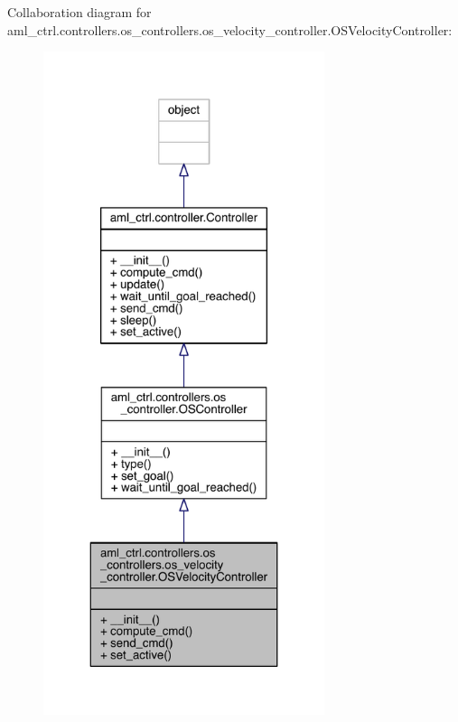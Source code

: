Collaboration diagram for aml\+\_\+ctrl.\+controllers.\+os\+\_\+controllers.\+os\+\_\+velocity\+\_\+controller.\+O\+S\+Velocity\+Controller\+:\nopagebreak
\begin{figure}[H]
\begin{center}
\leavevmode
\includegraphics[height=550pt]{classaml__ctrl_1_1controllers_1_1os__controllers_1_1os__velocity__controller_1_1_o_s_velocity_controller__coll__graph}
\end{center}
\end{figure}
